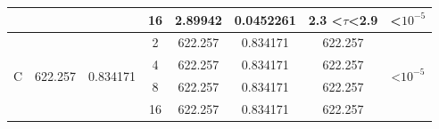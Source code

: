 \documentclass{vie16}
\begin{document}
\begin{table}[h!]
\begin{tabular}{@{}|c|c|c|c|c|c|c|c|@{}}
                   &                          &                            & 16                                 & 2.89942         & 0.0452261         & 2.3 \textless$\tau$\textless 2.9  & \textless $10^{-5}$                  \\ \hline
\multirow{4}{*}{C} & \multirow{4}{*}{622.257} & \multirow{4}{*}{0.834171}  & 2                                  & 622.257         & 0.834171          & 622.257                           & \multirow{4}{*}{\textless $10^{-5}$} \\
                   &                          &                            & 4                                  & 622.257         & 0.834171          & 622.257                           &                                      \\
                   &                          &                            & 8                                  & 622.257         & 0.834171          & 622.257                           &                                      \\
                   &                          &                            & 16                                 & 622.257         & 0.834171          & 622.257                           &                                   \\  \hline
\end{tabular}
\end{table}
\end{document}
